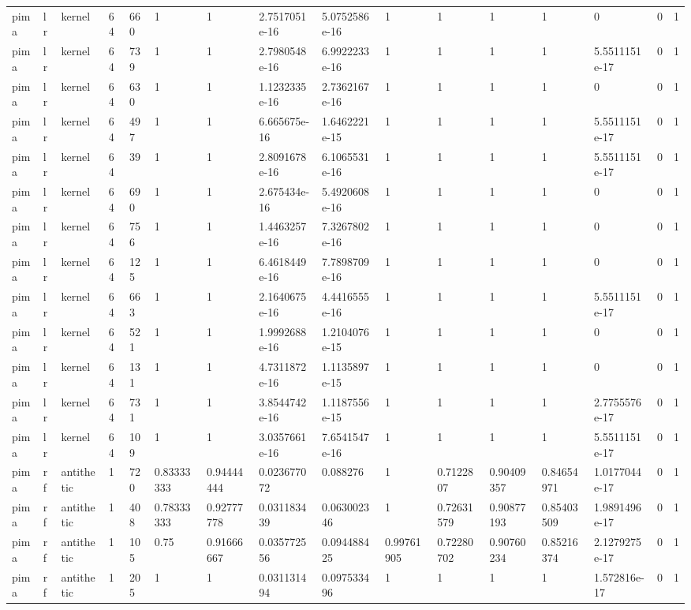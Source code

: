 \begin{tabular}{llllllllllllllll}
pima & lr & kernel & 64 & 660 & 1 & 1 & 2.7517051e-16 & 5.0752586e-16 & 1 & 1 & 1 & 1 & 0 & 0 & 1 \\
pima & lr & kernel & 64 & 739 & 1 & 1 & 2.7980548e-16 & 6.9922233e-16 & 1 & 1 & 1 & 1 & 5.5511151e-17 & 0 & 1 \\
pima & lr & kernel & 64 & 630 & 1 & 1 & 1.1232335e-16 & 2.7362167e-16 & 1 & 1 & 1 & 1 & 0 & 0 & 1 \\
pima & lr & kernel & 64 & 497 & 1 & 1 & 6.665675e-16 & 1.6462221e-15 & 1 & 1 & 1 & 1 & 5.5511151e-17 & 0 & 1 \\
pima & lr & kernel & 64 & 39 & 1 & 1 & 2.8091678e-16 & 6.1065531e-16 & 1 & 1 & 1 & 1 & 5.5511151e-17 & 0 & 1 \\
pima & lr & kernel & 64 & 690 & 1 & 1 & 2.675434e-16 & 5.4920608e-16 & 1 & 1 & 1 & 1 & 0 & 0 & 1 \\
pima & lr & kernel & 64 & 756 & 1 & 1 & 1.4463257e-16 & 7.3267802e-16 & 1 & 1 & 1 & 1 & 0 & 0 & 1 \\
pima & lr & kernel & 64 & 125 & 1 & 1 & 6.4618449e-16 & 7.7898709e-16 & 1 & 1 & 1 & 1 & 0 & 0 & 1 \\
pima & lr & kernel & 64 & 663 & 1 & 1 & 2.1640675e-16 & 4.4416555e-16 & 1 & 1 & 1 & 1 & 5.5511151e-17 & 0 & 1 \\
pima & lr & kernel & 64 & 521 & 1 & 1 & 1.9992688e-16 & 1.2104076e-15 & 1 & 1 & 1 & 1 & 0 & 0 & 1 \\
pima & lr & kernel & 64 & 131 & 1 & 1 & 4.7311872e-16 & 1.1135897e-15 & 1 & 1 & 1 & 1 & 0 & 0 & 1 \\
pima & lr & kernel & 64 & 731 & 1 & 1 & 3.8544742e-16 & 1.1187556e-15 & 1 & 1 & 1 & 1 & 2.7755576e-17 & 0 & 1 \\
pima & lr & kernel & 64 & 109 & 1 & 1 & 3.0357661e-16 & 7.6541547e-16 & 1 & 1 & 1 & 1 & 5.5511151e-17 & 0 & 1 \\
pima & rf & antithetic & 1 & 720 & 0.83333333 & 0.94444444 & 0.023677072 & 0.088276 & 1 & 0.7122807 & 0.90409357 & 0.84654971 & 1.0177044e-17 & 0 & 1 \\
pima & rf & antithetic & 1 & 408 & 0.78333333 & 0.92777778 & 0.031183439 & 0.063002346 & 1 & 0.72631579 & 0.90877193 & 0.85403509 & 1.9891496e-17 & 0 & 1 \\
pima & rf & antithetic & 1 & 105 & 0.75 & 0.91666667 & 0.035772556 & 0.094488425 & 0.99761905 & 0.72280702 & 0.90760234 & 0.85216374 & 2.1279275e-17 & 0 & 1 \\
pima & rf & antithetic & 1 & 205 & 1 & 1 & 0.031131494 & 0.097533496 & 1 & 1 & 1 & 1 & 1.572816e-17 & 0 & 1 \\

\end{tabular}
